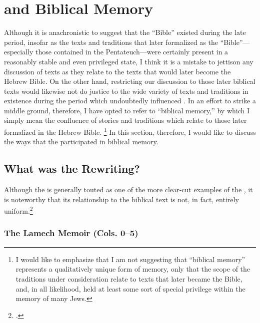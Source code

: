 
\section{\ga and Biblical Memory}


Although it is anachronistic to suggest that the ``Bible''  existed during the late \secondtemple period, insofar as the texts and traditions that later formalized as the ``Bible''---especially those contained in the Pentateuch---were certainly present in a reasonably stable and even privileged state, I think it is a mistake to jettison any discussion of \rwb texts as they relate to the texts that would later become the Hebrew Bible. On the other hand, restricting our discussion to those later biblical texts would likewise not do justice to the wide variety of texts and traditions in existence during the \secondtemple period which undoubtedly influenced \ga. In an effort to strike a middle ground, therefore, I have opted to refer to ``biblical memory,'' by which I simply mean the confluence of stories and traditions which relate to those later formalized in the Hebrew Bible.%
%
\footnote{I would like to emphasize that I am not suggesting that ``biblical memory'' represents a qualitatively unique form of memory, only that the scope of the traditions under consideration relate to texts that later became the Bible, and, in all likelihood, held at least some sort of special privilege within the memory of many \secondtemple Jews.}
%
In this section, therefore, I would like to discuss the ways that the \ga participated in biblical memory.

\subsection{What was the \ga Rewriting?}

Although the \ga is generally touted as one of the more clear-cut examples of the \rwb, it is noteworthy that its relationship to the biblical text is not, in fact, entirely uniform.\footnote{\cite[333]{bernstein_berthelot-etal2010}.}


\subsubsection{The Lamech Memoir (Cols. 0--5)}

